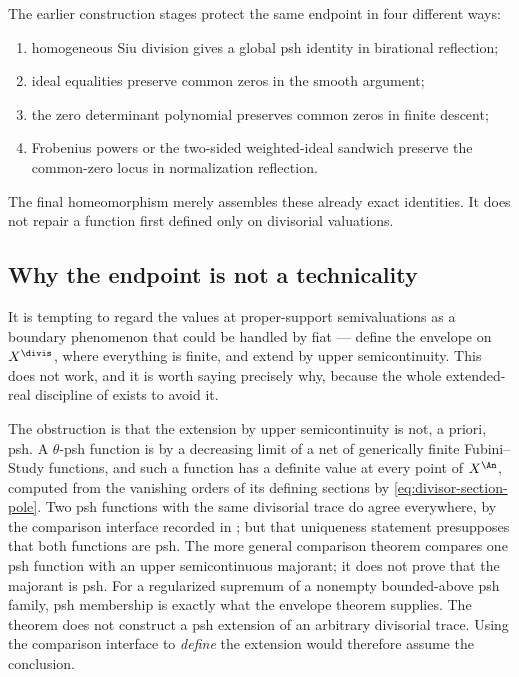The earlier construction stages protect the same endpoint in four different
ways:
\begin{enumerate}
\item homogeneous Siu division gives a global psh identity in birational
      reflection;
\item ideal equalities preserve common zeros in the smooth argument;
\item the zero determinant polynomial preserves common zeros in finite
      descent;
\item Frobenius powers or the two-sided weighted-ideal sandwich preserve the
      common-zero locus in normalization reflection.
\end{enumerate}
The final homeomorphism merely assembles these already exact identities.
It does not repair a function first defined only on divisorial valuations.

\subsection{Why the endpoint is not a technicality}
\label{sec:ch45-endpoint-why}

It is tempting to regard the values at proper-support semivaluations as a
boundary phenomenon that could be handled by fiat --- define the envelope on
$X^{\divis}$, where everything is finite, and extend by upper
semicontinuity.  This does not work, and it is worth saying precisely why,
because the whole extended-real discipline of
exists to avoid it.

The obstruction is that the extension by upper semicontinuity is not, a
priori, psh.  A $\theta$-psh function is by  a decreasing
limit of a net of generically finite Fubini--Study functions, and such a
function has a definite value at every point of $X^{\An}$, computed from
the vanishing orders of its defining sections by
\eqref{eq:divisor-section-pole}.  Two psh functions with the same divisorial
trace do agree everywhere, by the comparison interface
\cite[Theorem~4.22]{BJ22} recorded in ; but
that uniqueness statement presupposes that both functions are psh.
The more general comparison theorem compares one psh function with an
upper semicontinuous majorant; it does not prove that the majorant is psh.
For a regularized supremum of a nonempty bounded-above psh family,
psh membership is exactly what the envelope theorem supplies.  The
theorem does not construct a psh extension of an arbitrary divisorial
trace.  Using the comparison interface to
\emph{define} the extension would therefore assume the conclusion.


